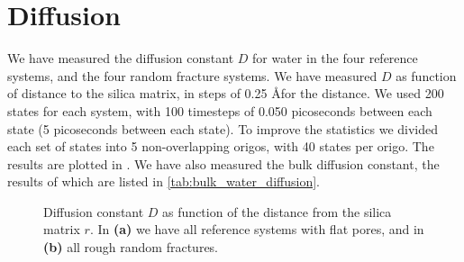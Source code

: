 \section{Diffusion}
%

%

We have measured the diffusion constant $D$ for water in the four reference systems, and the four random fracture systems. We have measured $D$ as function of distance to the silica matrix, in steps of 0.25 \AA for the distance. We used 200 states for each system, with 100 timesteps of 0.050 picoseconds between each state (5 picoseconds between each state). To improve the statistics we divided each set of states into 5 non-overlapping origos, with 40 states per origo. The results are plotted in . We have also measured the bulk diffusion constant, the results of which are listed in \cref{tab:bulk_water_diffusion}.
%
\begin{figure}[!htb]%
\setlength{\myfigwidth}{0.58\textwidth}%
%
\caption{%
    Diffusion constant $D$ as function of the distance from the silica matrix $r$. In \textbf{(a)} we have all reference systems with flat pores, and in \textbf{(b)} all rough random fractures.
    \label{fig:first_diffusion_figure}%
}%
\end{figure}%

